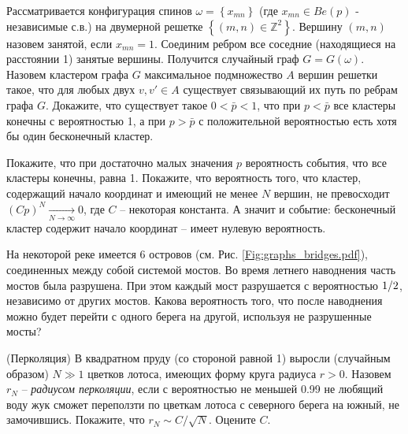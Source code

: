  
\begin{problem} 
Рассматривается конфигурация спинов $\omega =\left\{x_{mn} \right\}$ (где $x_{mn} \in Be(p) $ - независимые с.в.) на двумерной решетке $\left\{(m,n) \in {\mathbb Z}^{2} \right\}$. Вершину $(m,n)$ назовем занятой, если $x_{mn} =1$. Соединим ребром все соседние (находящиеся на расстоянии 1) занятые вершины. Получится случайный граф $G=G\left(\omega \right)$. Назовем кластером графа $G$ максимальное подмножество $A$ вершин решетки такое, что для любых двух $v,v'\in A$ существует связывающий их путь по ребрам графа $G$. Докажите, что существует такое $0<\bar{p}<1$, что при $p<\bar{p}$ все кластеры конечны с вероятностью 1, а при $p>\bar{p}$ с положительной вероятностью есть хотя бы один бесконечный кластер.
 
 
\begin{ordre}
Покажите, что при достаточно малых значения $p$ вероятность события, что все кластеры конечны, равна 1. Покажите, что вероятность того, что кластер, содержащий начало координат и имеющий не менее $N$ вершин, не превосходит $\left(Cp\right)^{N} \mathop{\to }\limits_{N\to \infty } 0$, где $C$ -- некоторая константа. А значит и событие: бесконечный кластер содержит начало координат -- имеет нулевую вероятность.
\end{ordre}
 
\end{problem}

\begin{problem}

На некоторой реке имеется 6 островов (см. Рис. \ref{Fig:graphs_bridges.pdf}), соединенных между собой системой мостов. Во время летнего наводнения часть мостов была разрушена. При этом каждый мост разрушается с вероятностью ${1\mathord{\left/ {\vphantom {1 2}} \right. \kern-\nulldelimiterspace} 2} $, независимо от других мостов. Какова вероятность того, что после наводнения можно будет перейти с одного берега на другой, используя не разрушенные мосты?


\end{problem}


\begin{problem}\Star(Перколяция)
В квадратном пруду (со стороной равной 1) 
выросли (случайным образом) $N\gg 1$ цветков лотоса, имеющих форму круга 
радиуса $r>0$. Назовем $r_N $ -- \textit{радиусом перколяции}, если с вероятностью не меньшей 0.99 не 
любящий воду жук сможет переползти по цветкам лотоса с северного берега на 
южный, не замочившись. Покажите, что $r_N \sim C / \sqrt{N}$. Оцените $C$.



\end{problem}

